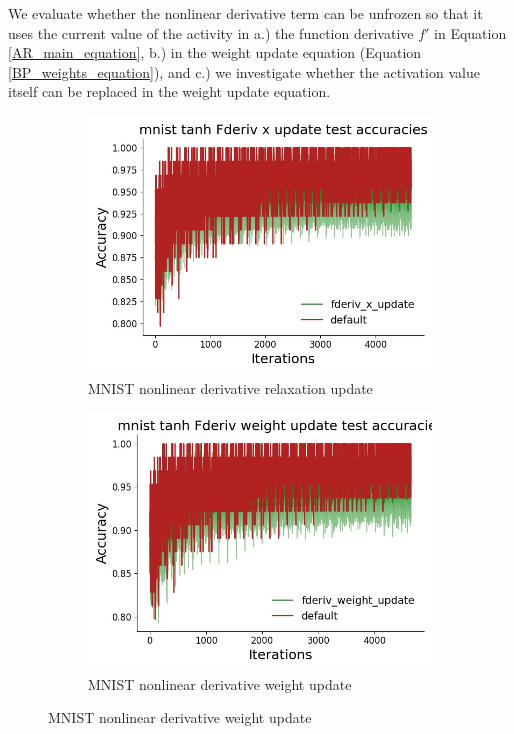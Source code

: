 We evaluate whether the nonlinear derivative term can be unfrozen so that it uses the current value of the activity in a.) the function derivative $f'$ in Equation \ref{AR_main_equation}, b.) in the weight update equation (Equation \ref{BP_weights_equation}), and c.) we investigate whether the activation value itself can be replaced in the weight update equation.
\begin{figure}[htb]
\label{AR_no_frozen_pass}
\centering
  \begin{subfigure}[b]{0.4\linewidth}
    \centering
    \includegraphics[width=0.75\linewidth]{chapter_6_figures/AR/mnist_tanh_Fderiv_x_update_test_accuracies_prelim_2.jpg} 
    \caption{MNIST nonlinear derivative relaxation update} 
    \vspace{4ex}
  \end{subfigure}%
  \begin{subfigure}[b]{0.4\linewidth}
    \centering
    \includegraphics[width=0.75\linewidth]{chapter_6_figures/AR/mnist_tanh_Fderiv_weight_update_test_accuracies_prelim_2.jpg} 
    \caption{MNIST nonlinear derivative weight update} 
    \vspace{4ex}

\end{subfigure}
\end{figure}
